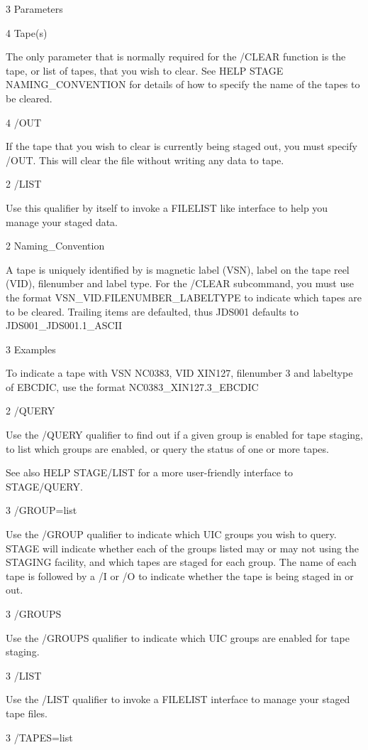 \begin{XMP}
3 Parameters

4 Tape(s)

The only parameter that is normally required for the /CLEAR function
is the tape, or list of tapes, that you wish to clear.
See HELP STAGE NAMING_CONVENTION for details of how to specify
the name of the tapes to be cleared.

4 /OUT

If the tape that you wish to clear is currently being staged out,
you must specify /OUT. This will clear the file without writing
any data to tape.

2 /LIST

Use this qualifier by itself to invoke a FILELIST like interface to help
you manage your staged data.

2 Naming_Convention

 A tape is uniquely identified by is magnetic label (VSN),
 label on the tape reel (VID), filenumber and label type. For the
 /CLEAR subcommand, you must use the format VSN_VID.FILENUMBER_LABELTYPE
 to indicate which tapes are to be cleared. Trailing items are defaulted,
 thus JDS001 defaults to JDS001_JDS001.1_ASCII

3 Examples

To indicate a tape with VSN NC0383, VID XIN127, filenumber 3 and labeltype
of EBCDIC, use the format NC0383_XIN127.3_EBCDIC

2 /QUERY

Use the /QUERY qualifier to find out if a given group is enabled for
tape staging, to list which groups are enabled, or query the status
of one or more tapes.

See also HELP STAGE/LIST for a more user-friendly interface to
STAGE/QUERY.

3 /GROUP=list

Use the /GROUP qualifier to indicate which UIC groups you wish to
query. STAGE will indicate whether each of the groups listed may or
may not using the STAGING facility, and which tapes are staged for
each group. The name of each tape is followed by a /I or /O to indicate
whether the tape is being staged in or out.

3 /GROUPS

Use the /GROUPS qualifier to indicate which UIC groups are enabled
for tape staging.

3 /LIST

Use the /LIST qualifier to invoke a FILELIST interface to manage
your staged tape files.

3 /TAPES=list


\end{XMP}

